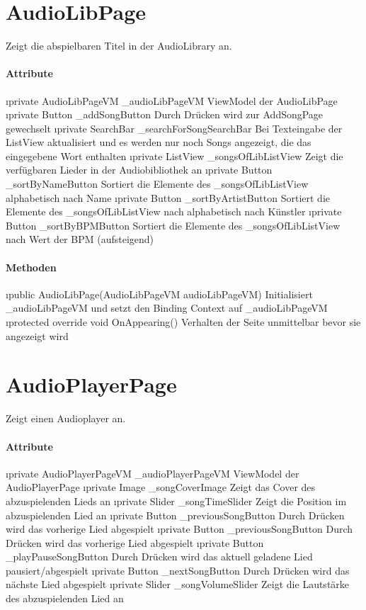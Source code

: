 \documentclass[../entwurf.tex]{subfiles}
\begin{document}
\section{AudioLibPage}
Zeigt die abspielbaren Titel in der AudioLibrary an.
\paragraph{Attribute}
\begin{itemize}
	\i{private AudioLibPageVM \_audioLibPageVM} ViewModel der AudioLibPage
	\i{private Button \_addSongButton} Durch Drücken wird zur AddSongPage gewechselt
	\i{private SearchBar \_searchForSongSearchBar} Bei Texteingabe der ListView aktualisiert und es werden nur noch Songs angezeigt, die das eingegebene Wort enthalten
	\i{private ListView \_songsOfLibListView} Zeigt die verfügbaren Lieder in der Audiobibliothek an
	\i{private Button \_sortByNameButton} Sortiert die Elemente des \_songsOfLibListView alphabetisch nach Name
	\i{private Button \_sortByArtistButton} Sortiert die Elemente des \_songsOfLibListView nach alphabetisch nach Künstler
	\i{private Button \_sortByBPMButton} Sortiert die Elemente des \_songsOfLibListView nach Wert der BPM (aufsteigend)
\end{itemize}

\paragraph{Methoden}
\begin{itemize}
	\i{public AudioLibPage(AudioLibPageVM audioLibPageVM)} Initialisiert \_audioLibPageVM und setzt den Binding Context 			auf \_audioLibPageVM
	\i{protected override void OnAppearing()} Verhalten der Seite unmittelbar bevor sie angezeigt wird
\end{itemize}

\section{AudioPlayerPage}
Zeigt einen Audioplayer an.
\paragraph{Attribute}
\begin{itemize}
	\i{private AudioPlayerPageVM \_audioPlayerPageVM} ViewModel der AudioPlayerPage
	\i{private Image \_songCoverImage} Zeigt das Cover des abzuspielenden Lieds an
	\i{private Slider \_songTimeSlider} Zeigt die Position im abzuspielenden Lied an
	\i{private Button \_previousSongButton} Durch Drücken wird das vorherige Lied abgespielt
	\i{private Button \_previousSongButton} Durch Drücken wird das vorherige Lied abgespielt
	\i{private Button \_playPauseSongButton} Durch Drücken wird das aktuell geladene Lied pausiert/abgespielt
	\i{private Button \_nextSongButton} Durch Drücken wird das nächste Lied abgespielt
	\i{private Slider \_songVolumeSlider} Zeigt die Lautstärke des abzuspielenden Lied an
\end{itemize}
\end{document}
